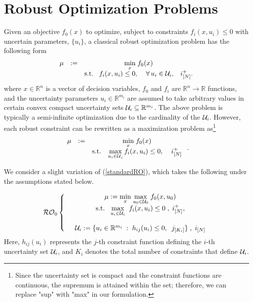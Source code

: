 \documentclass[journal,twoside,web]{ieeecolor}
\newcommand{\rev}[1]{\textcolor{revisionblue}{#1}}
\newcommand{\real}{\mathbb{R}}
\begin{document}
\section{Robust Optimization Problems}\label{sec_RO}
Given an objective $f_0(x)$ to optimize, subject to constraints $f_i(x,u_i) \leq 0$ with uncertain parameters, $\{u_i\}$, a classical robust optimization problem has the following form
$$
\begin{array}{ccc}
\mu&:=&\underset{x}{\min}\; f_0(x)\\
&&\text{s.t.}\;\;\;f_i(x,u_i)\leq 0,\;\;\;\; \forall \,u_i\in {\cal U}_i,\;\;\;i^+_{[N]}.
\end{array}
$$
where $x\in \real^n$ is a vector of decision variables, $f_0$ and $f_i$ are $\real^n \to \real$ functions, and the uncertainty parameters $u_i \in \real^{m_i}$ are assumed to take arbitrary values in certain convex compact uncertainty sets ${\cal U}_i \subseteq \real^{m_i}$.
The above problem is typically a semi-infinite optimization due to the cardinality of the ${\cal U}_i$. However, each robust constraint can be rewritten as a maximization problem as\footnote{\rev{Since the uncertainty set is compact and the constraint functions are continuous, the supremum is attained within the set; therefore, we can replace "sup" with "max" in our formulation.}}
\begin{align}
\begin{array}{ccc}
\mu&:=&\underset{x}{\min}\; f_0(x)\\
&&\text{s.t.}\;\;\;\displaystyle\max_{{u_i\in \cal U}_i} f_i(x,u_i)\leq 0,\;\;\;\;i^+_{[N]}
\end{array}\;.\label{standardRO}
\end{align}

We consider a slight variation of (\ref{standardRO}), which takes the following under the assumptions stated below.

\begin{equation}\label{RO0}
{\cal RO}_0\left\{ \begin{array}{ccc}
&\mu:=\underset{x}{\min} \;\underset{u_0\in {\cal U}_0}{\max}\; f_0(x,u_0)\\
&\text{s.t.}\;\;\;\underset{u_i\in {\cal U}_i}{\max}\;\; f_i(x,u_i)\leq 0\;,\;i^+_{[N]},\\ \\
&{\cal U}_i:=\{u_ i\in \mathbb{R}^{m_i}\;:\;h_{ij}(u_i)\leq 0,\;\;j_{[K_i]}\}\;,\;i_{[N]}
\end{array}\right.
\end{equation}
\rev{Here, $h_{ij}(u_i)$ represents the $j$-th constraint function defining the $i$-th uncertainty set ${\cal U}_i$, and $K_i$ denotes the total number of constraints that define ${\cal U}_i$.} 
\end{document}
